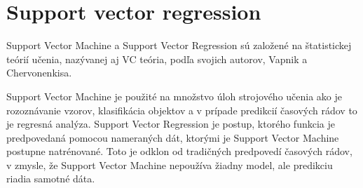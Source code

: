 \documentclass[12pt,oneside,slovak,a4paper]{book}
\begin{document}
\section{Support vector regression}
Support Vector Machine a Support Vector Regression sú založené na štatistickej
teórií učenia, nazývanej aj VC teória, podľa svojich autorov, Vapnik
a Chervonenkisa.

Support Vector Machine je použité na množstvo úloh strojového učenia ako je
rozoznávanie vzorov, klasifikácia objektov a v prípade predikcií časových
rádov to je regresná analýza. Support Vector Regression je postup, ktorého
funkcia je predpovedaná pomocou nameraných dát, ktorými je Support Vector
Machine postupne natrénované. Toto je odklon od tradičných predpovedí časových
rádov, v zmysle, že Support Vector Machine nepoužíva žiadny model, ale
predikciu riadia samotné dáta\cite{Sapankevych2009}.

%




\end{document}
